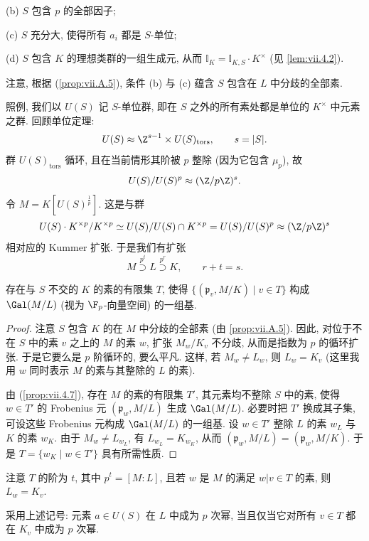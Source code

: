 (b) $S$ 包含 $p$ 的全部因子;

(c) $S$ 充分大, 使得所有 $a_i$ 都是 $S$-单位;

(d) $S$ 包含 $K$ 的理想类群的一组生成元, 从而 $\mathbb{I}_K=\mathbb{I}_{K,S}\cdot K^{\times}$ (见 \ref{lem:vii.4.2}).

注意, 根据 (\ref{prop:vii.A.5}), 条件 (b) 与 (c) 蕴含 $S$ 包含在 $L$ 中分歧的全部素.

照例, 我们以 $U(S)$ 记 $S$-单位群, 即在 $S$ 之外的所有素处都是单位的 $K^{\times}$ 中元素之群. 回顾单位定理:
\[
U(S)\approx\Z^{s-1}\times U(S)_{\mathrm{tors}},\qquad s=|S|.
\]
群 $U(S)_{\mathrm{tors}}$ 循环, 且在当前情形其阶被 $p$ 整除 (因为它包含 $\mu_p$), 故
\[
U(S)/U(S)^{p}\approx(\Z/p\Z)^{s}.
\]
令 $M=K[U(S)^{\frac{1}{p}}]$. 这是与群
\[
U(S)\cdot K^{\times p}/K^{\times p}\simeq U(S)/U(S)\cap K^{\times p}=U(S)/U(S)^{p}\approx(\Z/p\Z)^{s}
\]
相对应的 Kummer 扩张. 于是我们有扩张
\[
M\overset{p^{t}}{\supset}L\overset{p^{r}}{\supset}K,\qquad r+t=s.
\]

\begin{lemma}\label{lem:vii.6.2}
存在与 $S$ 不交的 $K$ 的素的有限集 $T$, 使得 $\{(\mathfrak{p}_{v},M/K)\mid v\in T\}$ 构成 $\Gal(M/L)$ (视为 $\F_p$-向量空间) 的一组基.
\end{lemma}

\begin{proof}
注意 $S$ 包含 $K$ 的在 $M$ 中分歧的全部素 (由 \ref{prop:vii.A.5}). 因此, 对位于不在 $S$ 中的素 $v$ 之上的 $M$ 的素 $w$, 扩张 $M_w/K_v$ 不分歧, 从而是指数为 $p$ 的循环扩张. 于是它要么是 $p$ 阶循环的, 要么平凡. 这样, 若 $M_w\ne L_w$, 则 $L_w=K_v$ (这里我用 $w$ 同时表示 $M$ 的素与其整除的 $L$ 的素).

由 (\ref{prop:vii.4.7}), 存在 $M$ 的素的有限集 $T'$, 其元素均不整除 $S$ 中的素, 使得 $w\in T'$ 的 Frobenius 元 $(\mathfrak{p}_w,M/L)$ 生成 $\Gal(M/L)$. 必要时把 $T'$ 换成其子集, 可设这些 Frobenius 元构成 $\Gal(M/L)$ 的一组基. 设 $w\in T'$ 整除 $L$ 的素 $w_L$ 与 $K$ 的素 $w_K$. 由于 $M_w\ne L_{w_L}$, 有 $L_{w_L}=K_{w_K}$, 从而 $(\mathfrak{p}_w,M/L)=(\mathfrak{p}_w,M/K)$. 于是 $T=\{w_K\mid w\in T'\}$ 具有所需性质.
\end{proof}

注意 $T$ 的阶为 $t$, 其中 $p^{t}=[M:L]$, 且若 $w$ 是 $M$ 的满足 $w|v\in T$ 的素, 则 $L_w=K_v$.

\begin{lemma}\label{lem:vii.6.3}
采用上述记号: 元素 $a\in U(S)$ 在 $L$ 中成为 $p$ 次幂, 当且仅当它对所有 $v\in T$ 都在 $K_v$ 中成为 $p$ 次幂.
\end{lemma}


